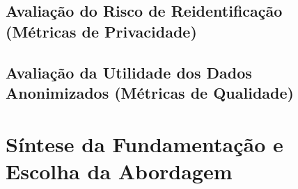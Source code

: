 \subsection{Avaliação do Risco de Reidentificação (Métricas de Privacidade)}
\label{subsec:fund-metricas-privacidade}

\subsection{Avaliação da Utilidade dos Dados Anonimizados (Métricas de Qualidade)}
\label{subsec:fund-metricas-utilidade}

\section{Síntese da Fundamentação e Escolha da Abordagem}
\label{sec:fund-sintese}
